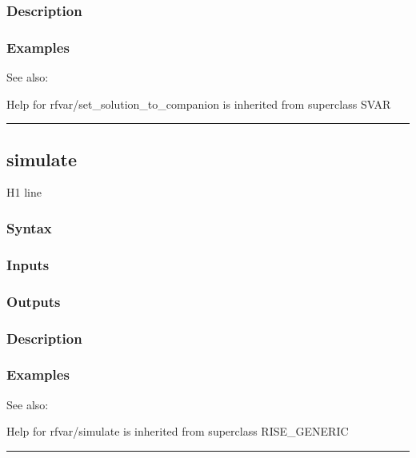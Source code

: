 \documentclass[letterpaper,10pt,english]{sphinxmanual}
\begin{document}
\subsubsection{Description}
\label{classes/models/@rfvar/rfvar:id117}

\subsubsection{Examples}
\label{classes/models/@rfvar/rfvar:id118}
See also:

Help for rfvar/set\_solution\_to\_companion is inherited from superclass SVAR


\bigskip\hrule{}\bigskip



\subsection{simulate}
\label{classes/models/@rfvar/rfvar:id119}\label{classes/models/@rfvar/rfvar:simulate}
H1 line


\subsubsection{Syntax}
\label{classes/models/@rfvar/rfvar:id120}

\subsubsection{Inputs}
\label{classes/models/@rfvar/rfvar:id121}

\subsubsection{Outputs}
\label{classes/models/@rfvar/rfvar:id122}

\subsubsection{Description}
\label{classes/models/@rfvar/rfvar:id123}

\subsubsection{Examples}
\label{classes/models/@rfvar/rfvar:id124}
See also:

Help for rfvar/simulate is inherited from superclass RISE\_GENERIC


\bigskip\hrule{}\bigskip
\end{document}
